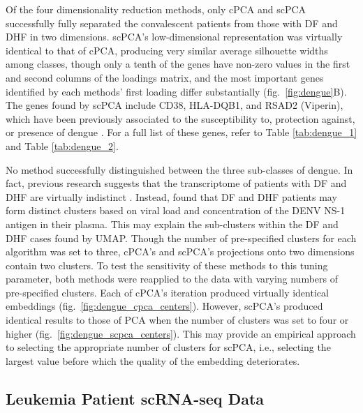 Of the four dimensionality reduction methods, only cPCA and scPCA successfully fully separated the convalescent patients from those with DF and DHF in two dimensions. scPCA's low-dimensional representation was virtually identical to that of cPCA, producing very similar average silhouette widths among classes, though only a tenth of the genes have non-zero values in the first and second columns of the loadings matrix, and the most important genes identified by each methods' first loading differ substantially (fig.~\ref{fig:dengue}B). The genes found by scPCA include CD38, HLA-DQB1, and RSAD2 (Viperin), which have been previously associated to the susceptibility to, protection against, or presence of dengue \cite{Castaneda2016,Cardozo2014,Fitzgerald2011}. For a full list of these genes, refer to Table \ref{tab:dengue_1} and Table \ref{tab:dengue_2}. 

No method successfully distinguished between the three sub-classes of dengue. In fact, previous research suggests that the transcriptome of patients with DF and DHF are virtually indistinct \cite{Kwissa2014}. Instead, \citet{Kwissa2014} found that DF and DHF patients may form distinct clusters based on viral load and concentration of the DENV NS-1 antigen in their plasma. This may explain the sub-clusters within the DF and DHF cases found by UMAP. Though the number of pre-specified clusters for each algorithm was set to three, cPCA's and scPCA's projections onto two dimensions contain two clusters. To test the sensitivity of these methods to this tuning parameter, both methods were reapplied to the data with varying numbers of pre-specified clusters. Each of cPCA's iteration produced virtually identical embeddings (fig.~\ref{fig:dengue_cpca_centers}). However, scPCA's produced identical results to those of PCA when the number of clusters was set to four or higher (fig.~\ref{fig:dengue_scpca_centers}). This may provide an empirical approach to selecting the appropriate number of clusters for scPCA, i.e., selecting the largest value before which the quality of the embedding deteriorates.

\FloatBarrier

\subsection{Leukemia Patient scRNA-seq Data}\label{leukemia_data}


